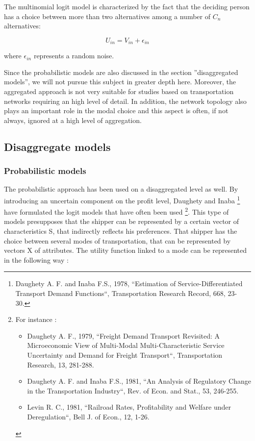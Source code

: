 The multinomial logit model is characterized by the fact that the deciding person has
a choice between more than two alternatives among a number of $C_n$
alternatives:

$$U_{in}=V_{in}+\epsilon _{in}$$

where $\epsilon _{in}$  represents a random noise.


Since the probabilistic models are also discussed in the section ''disaggregated
models'', we will not pursue this subject in greater depth here. Moreover, the aggregated approach is not very suitable for studies based on
transportation networks requiring an high level of detail.  In addition, the
network topology also plays an important role in the modal choice and this aspect
is often, if not always, ignored at a high level of aggregation.




\subsection{Disaggregate models}

\subsubsection{Probabilistic models}


The probabilistic approach has been used on a disaggregated level as well. By
introducing an uncertain component on the profit level, Daughety and Inaba
\footnote{Daughety A. F. and Inaba F.S., 1978, ``Estimation of
Service-Differentiated Transport Demand Functions``, Transportation Research
Record, 668, 23-30.} have formulated the logit models that have often been used
\footnote{For instance :
\begin{itemize}
\item Daughety A. F., 1979, ``Freight Demand Transport Revisited: A
Microeconomic View of Multi-Modal Multi-Characteristic Service
Uncertainty and Demand for Freight Transport``, Transportation
Research, 13, 281-288.
\item Daughety A. F. and Inaba F.S., 1981, ``An Analysis of Regulatory Change
in the Transportation Industry``, Rev. of Econ. and Stat., 53,
246-255.
\item Levin R. C., 1981, ``Railroad Rates, Profitability and Welfare under
Deregulation``, Bell J. of Econ., 12, 1-26.
\end{itemize}}. This type of models presupposes that the shipper can be
represented by a certain vector of characteristics S, that indirectly reflects his
preferences.  That shipper has the choice between several modes of transportation,
that can be represented by vectors X of attributes.  The utility function linked to
a mode can be represented in the following way :

